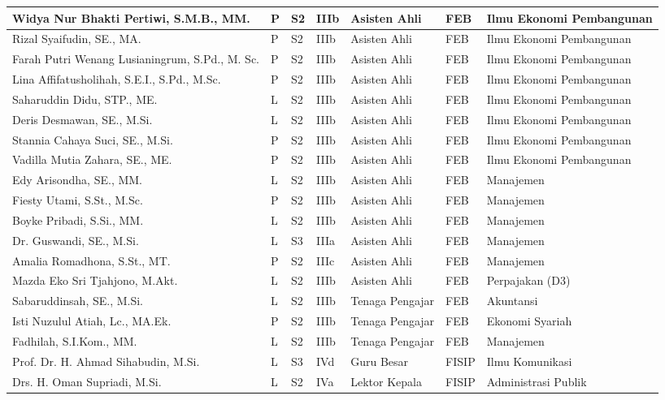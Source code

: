 \documentclass[
]{book}
\begin{document}
\begin{longtable}{l|l|l|l|l|l|l}
\hline
Widya Nur Bhakti Pertiwi, S.M.B., MM. & P & S2 & IIIb & Asisten Ahli & FEB & Ilmu Ekonomi Pembangunan\\
\hline
Rizal Syaifudin, SE., MA. & P & S2 & IIIb & Asisten Ahli & FEB & Ilmu Ekonomi Pembangunan\\
\hline
Farah Putri Wenang Lusianingrum, S.Pd., M. Sc. & P & S2 & IIIb & Asisten Ahli & FEB & Ilmu Ekonomi Pembangunan\\
\hline
Lina Affifatusholihah, S.E.I., S.Pd., M.Sc. & P & S2 & IIIb & Asisten Ahli & FEB & Ilmu Ekonomi Pembangunan\\
\hline
Saharuddin Didu, STP., ME. & L & S2 & IIIb & Asisten Ahli & FEB & Ilmu Ekonomi Pembangunan\\
\hline
Deris Desmawan, SE., M.Si. & L & S2 & IIIb & Asisten Ahli & FEB & Ilmu Ekonomi Pembangunan\\
\hline
Stannia Cahaya Suci, SE., M.Si. & P & S2 & IIIb & Asisten Ahli & FEB & Ilmu Ekonomi Pembangunan\\
\hline
Vadilla Mutia Zahara, SE., ME. & P & S2 & IIIb & Asisten Ahli & FEB & Ilmu Ekonomi Pembangunan\\
\hline
Edy Arisondha, SE., MM. & L & S2 & IIIb & Asisten Ahli & FEB & Manajemen\\
\hline
Fiesty Utami, S.St., M.Sc. & P & S2 & IIIb & Asisten Ahli & FEB & Manajemen\\
\hline
Boyke Pribadi, S.Si., MM. & L & S2 & IIIb & Asisten Ahli & FEB & Manajemen\\
\hline
Dr. Guswandi, SE., M.Si. & L & S3 & IIIa & Asisten Ahli & FEB & Manajemen\\
\hline
Amalia Romadhona, S.St., MT. & P & S2 & IIIc & Asisten Ahli & FEB & Manajemen\\
\hline
Mazda Eko Sri Tjahjono, M.Akt. & L & S2 & IIIb & Asisten Ahli & FEB & Perpajakan (D3)\\
\hline
Sabaruddinsah, SE., M.Si. & L & S2 & IIIb & Tenaga Pengajar & FEB & Akuntansi\\
\hline
Isti Nuzulul Atiah, Lc., MA.Ek. & P & S2 & IIIb & Tenaga Pengajar & FEB & Ekonomi Syariah\\
\hline
Fadhilah, S.I.Kom., MM. & L & S2 & IIIb & Tenaga Pengajar & FEB & Manajemen\\
\hline
Prof. Dr. H. Ahmad Sihabudin, M.Si. & L & S3 & IVd & Guru Besar & FISIP & Ilmu Komunikasi\\
\hline
Drs. H. Oman Supriadi, M.Si. & L & S2 & IVa & Lektor Kepala & FISIP & Administrasi Publik\\

\end{longtable}
\end{document}

